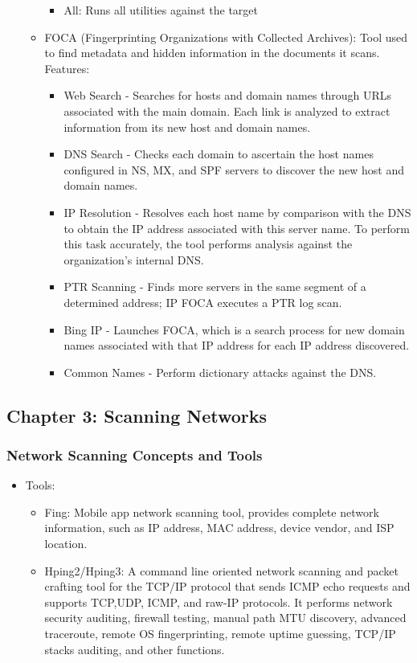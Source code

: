 \begin{itemize}
\begin{itemize}
\begin{itemize}
            \item All: Runs all utilities against the target
        \end{itemize}
        \item FOCA (Fingerprinting Organizations with Collected Archives): Tool used to find metadata and hidden information in the documents it  scans.\\
        Features:
        \begin{itemize}
            \item Web Search - Searches for hosts and domain names through URLs associated with the main domain. Each link is analyzed to extract information from its new host and domain names.
            \item DNS Search - Checks each domain to ascertain the host names configured in NS, MX, and SPF servers to discover the new host and domain names.
            \item IP Resolution - Resolves each host name by comparison with the DNS to obtain the IP address associated with this server name. To perform this task accurately, the tool performs analysis against the organization's internal DNS.
            \item PTR Scanning - Finds more servers in the same segment of a determined address; IP FOCA executes a PTR log scan.
            \item Bing IP - Launches FOCA, which is a search process for new domain names associated with that IP address for each IP address discovered.
            \item Common Names - Perform dictionary attacks against the DNS.
        \end{itemize}
    \end{itemize}
\end{itemize}


\subsection{Chapter 3: Scanning Networks}
\subsubsection{Network Scanning Concepts and Tools}
\begin{itemize}
    \item Tools:
    \begin{itemize}
        \item Fing: Mobile app network scanning tool, provides complete network information, such as IP address, MAC address, device vendor, and ISP location.
        \item Hping2/Hping3: A command line oriented network scanning and packet crafting tool for the TCP/IP protocol that sends ICMP echo requests and supports TCP,UDP, ICMP, and raw-IP protocols. It performs network security auditing, firewall testing, manual path MTU discovery, advanced traceroute, remote OS fingerprinting, remote uptime guessing, TCP/IP stacks auditing, and other functions.
    \end{itemize}
\end{itemize}

